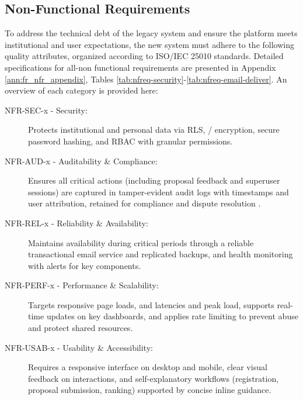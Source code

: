     \subsection{Non-Functional Requirements}
        {
            To address the technical debt of the legacy system and ensure the platform meets institutional and user expectations, 
            the new system must adhere to the following quality attributes, organized according to ISO/IEC 25010 standards. 
            Detailed specifications for all-non functional requirements are presented in Appendix \ref{ann:fr_nfr_appendix}, Tables \ref{tab:nfreq-security}-\ref{tab:nfreq-email-deliver}. 
            An overview of each category is provided here:
        }
        \begin{description}
            \item[NFR-SEC-x - Security:] 
                {
                    Protects institutional and personal data via \gls{RLS}, / encryption, secure password hashing,
                    and \gls{RBAC} with granular permissions.
                }
            \item[NFR-AUD-x - Auditability \& Compliance:] 
                {
                    Ensures all critical actions (including proposal feedback and superuser sessions) are captured in tamper-evident audit logs
                    with timestamps and user attribution, retained for compliance and dispute resolution \cite{fortra-audit-log-best-practices}.
                }
            \item[NFR-REL-x - Reliability \& Availability:] 
                {
                    Maintains availability during critical periods through a reliable transactional email service and replicated backups, and health
                    monitoring with alerts for key components.
                }
            \item[NFR-PERF-x - Performance \& Scalability:] 
                {
                    Targets responsive page loads, and  latencies and peak load, supports real-time updates on key dashboards,
                    and applies rate limiting to prevent abuse and protect shared resources.
                }
            \item[NFR-USAB-x - Usability \& Accessibility:] 
                {
                    Requires a responsive interface on desktop and mobile, clear visual feedback on interactions, and self-explanatory workflows 
                    (registration, proposal submission, ranking) supported by concise inline guidance.
}
\end{description}

